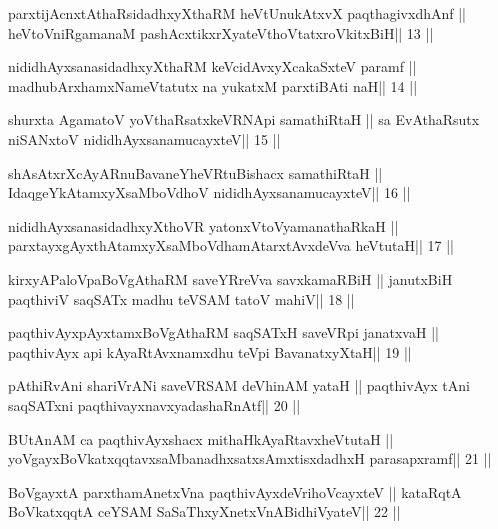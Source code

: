 \begin{shl}
parxtijAcnxtAthaRsidadhxyXthaRM heVtUnukAtxvX paqthagivxdhAnf ||
heVtoVniRgamanaM pashAcxtikxrXyateV\s thoVtatxroVkitxBiH\hfill || 13 ||
\end{shl}

\begin{shl}
nididhAyxsanasidadhxyXthaRM keVcidAvxyXcakaSxteV paramf ||
madhubArxhamxNameVtatutx na yukatxM parxtiBAti naH\hfill || 14 ||
\end{shl}

\begin{shl}
shurxta AgamatoV yoV\s thaRsatxkeVRNApi samathiRtaH ||
sa EvAthaRsutx niSANxtoV nididhAyxsanamucayxteV\hfill || 15 ||
\end{shl}

\begin{shl}
shAsAtxrXcAyARnuBavaneYheVRtuBishacx samathiRtaH ||
IdaqgeYkAtamxyXsaMboVdhoV nididhAyxsanamucayxteV\hfill || 16 ||
\end{shl}

\begin{shl}
nididhAyxsanasidadhxyXthoVR yatonxV\s toV\s yamanathaRkaH ||
parxtayxgAyxthAtamxyXsaMboVdhamAtarxtAvxdeVva heVtutaH\hfill || 17 ||
\end{shl}

\begin{shl}
kirxyAPaloVpaBoVgAthaRM saveYRreVva savxkamaRBiH ||
janutxBiH paqthiviV saqSATx madhu teVSAM tatoV mahiV\hfill || 18 ||
\end{shl}

\begin{shl}
paqthivAyx\s pAyxtamxBoVgAthaRM saqSATxH saveVR\s pi janatxvaH ||
paqthivAyx api kAyaRtAvxnamxdhu teV\s pi BavanatxyXtaH\hfill || 19 ||
\end{shl}

\begin{shl}
pAthiRvAni shariVrANi saveVRSAM deVhinAM yataH ||
paqthivAyx tAni saqSATxni paqthivayxnavxyadashaRnAtf\hfill || 20 ||
\end{shl}

\begin{shl}
BUtAnAM ca paqthivAyxshacx mithaHkAyaRtavxheVtutaH ||
yoVgayxBoVkatxqqtavxsaMbanadhxsatxsAmxtisxdadhxH parasapxramf\hfill || 21 ||
\end{shl}

\begin{shl}
BoVgayxtA parxthamAnetxVna paqthivAyxdeVrihoVcayxteV ||
kataRqtA BoVkatxqqtA ceYSAM SaSaThxyXnetxVnABidhiVyateV\hfill || 22 ||
\end{shl}

